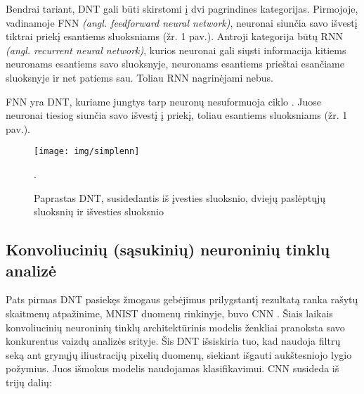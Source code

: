 \documentclass{VUMIFPSkursinis}
\begin{document}
Bendrai tariant, DNT gali būti skirstomi į dvi pagrindines kategorijas. Pirmojoje, vadinamoje FNN  \textit{(angl. feedforward neural network)}, neuronai siunčia savo išvestį tiktrai priekį esantiems sluoksniams (žr. 1 pav.). Antroji kategorija būtų RNN \textit{(angl. recurrent neural network)}, kurios neuronai gali siųsti informacija kitiems neuronams esantiems savo sluoksnyje, neuronams esantiems prieštai esančiame sluoksnyje ir net patiems sau. Toliau RNN nagrinėjami nebus. 

FNN yra DNT, kuriame jungtys tarp neuronų nesuformuoja ciklo \cite{FNNGer, Overview}. Juose neuronai tiesiog siunčia savo išvestį į priekį, toliau esantiems sluoksniams (žr. 1 pav.). 

\begin{figure}[H]
  \centering
  \texttt{[image: img/simplenn]}
  \caption{ Paprastas DNT, susidedantis iš įvesties sluoksnio, dviejų paslėptųjų sluoksnių ir išvesties sluoksnio \cite{Nont}}.
  \label{img:simplenn}
\end{figure}

\subsection{Konvoliucinių (sąsukinių) neuroninių tinklų analizė}

Pats pirmas DNT pasiekęs žmogaus gebėjimus prilygstantį rezultatą ranka rašytų skaitmenų atpažinime, MNIST duomenų rinkinyje, buvo CNN \cite{MnistBest}. Šiais laikais konvoliucinių neuroninių tinklų architektūrinis modelis ženkliai pranoksta savo konkurentus vaizdų analizės srityje. Šis DNT išsiskiria tuo, kad naudoja filtrų seką ant grynųjų iliustracijų pixelių duomenų, siekiant išgauti aukštesniojo lygio požymius. Juos išmokus modelis naudojamas klasifikavimui. CNN susideda iš trijų dalių: 
\end{document}
